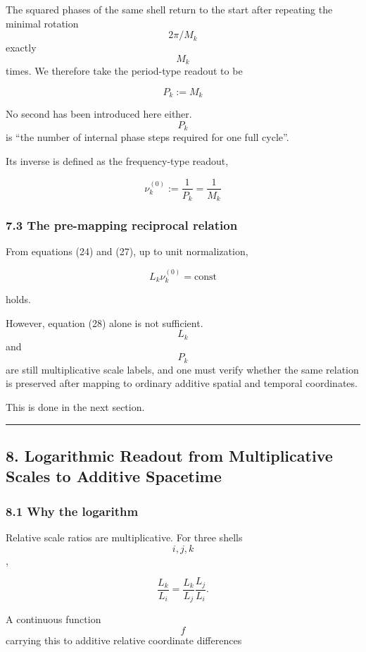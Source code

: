\documentclass[
  a4paper,
]{article}
\begin{document}
The squared phases of the same shell return to the start after repeating
the minimal rotation \[2\pi/M_k\] exactly \[M_k\] times. We therefore
take the period-type readout to be

\[
\boxed{
P_k:=M_k
}
\tag{26}
\]

No second has been introduced here either. \[P_k\] is ``the number of
internal phase steps required for one full cycle''.

Its inverse is defined as the frequency-type readout,

\[
\boxed{
\nu_k^{(0)}:=\frac{1}{P_k}
=\frac{1}{M_k}
}
\tag{27}
\]

\subsubsection{7.3 The pre-mapping reciprocal
relation}\label{the-pre-mapping-reciprocal-relation}

From equations (24) and (27), up to unit normalization,

\[
\boxed{
L_k\nu_k^{(0)}
=\mathrm{const}
}
\tag{28}
\]

holds.

However, equation (28) alone is not sufficient. \[L_k\] and \[P_k\] are
still multiplicative scale labels, and one must verify whether the same
relation is preserved after mapping to ordinary additive spatial and
temporal coordinates.

This is done in the next section.

\begin{center}\rule{0.5\linewidth}{0.5pt}\end{center}

\subsection{8. Logarithmic Readout from Multiplicative Scales to
Additive
Spacetime}\label{logarithmic-readout-from-multiplicative-scales-to-additive-spacetime}

\subsubsection{8.1 Why the logarithm}\label{why-the-logarithm}

Relative scale ratios are multiplicative. For three shells \[i,j,k\],

\[
\frac{L_k}{L_i}
=
\frac{L_k}{L_j}\frac{L_j}{L_i}.
\tag{29}
\]

A continuous function \[f\] carrying this to additive relative
coordinate differences
\end{document}
